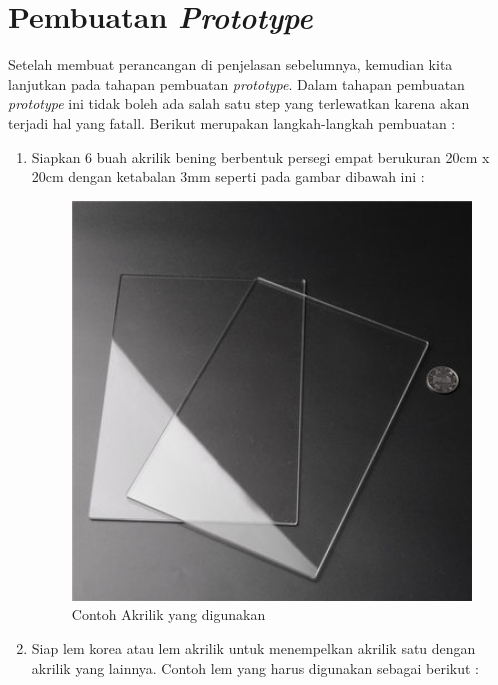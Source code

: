 \section{Pembuatan \textit{Prototype}}
Setelah membuat perancangan di penjelasan sebelumnya, kemudian kita lanjutkan pada tahapan pembuatan \textit{prototype}. Dalam tahapan pembuatan \textit{prototype} ini tidak boleh ada salah satu step yang terlewatkan karena akan terjadi hal yang fatall. Berikut merupakan langkah-langkah pembuatan :
\begin{enumerate}
    \item Siapkan 6 buah akrilik bening berbentuk persegi empat berukuran 20cm x 20cm dengan ketabalan 3mm seperti pada gambar dibawah ini :
\begin{figure}[H]
\centering
\includegraphics[width=1\textwidth]{figures/akrilik.jpg}
\caption{Contoh Akrilik yang digunakan}
\label{print}
\end{figure}

\item Siap lem korea atau lem akrilik untuk menempelkan akrilik satu dengan akrilik yang lainnya. Contoh lem yang harus digunakan sebagai berikut :


\end{enumerate}
